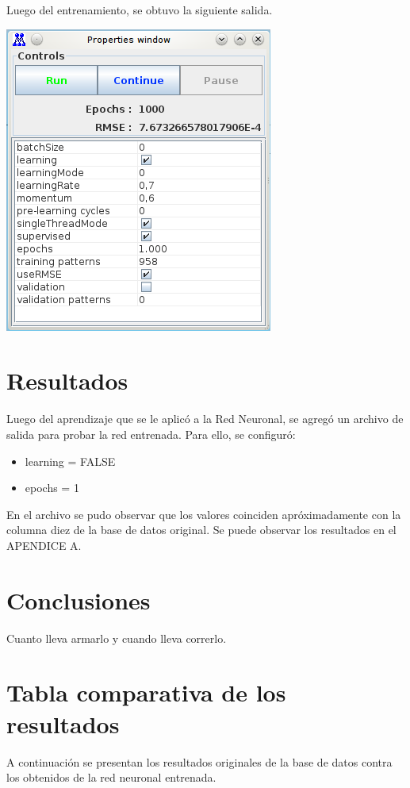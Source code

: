 \documentclass[12pt,titlepage]{article}
\begin{document}
Luego del entrenamiento, se obtuvo la siguiente salida.
\begin{center}
 \includegraphics{./Images/fin-corridas.png}
\end{center}

\section{Resultados}
Luego del aprendizaje que se le aplic\'o a la Red Neuronal, se agreg\'o un archivo de salida para probar la red entrenada. Para ello, se configur\'o: 
\begin{itemize}
 \item learning = FALSE
 \item epochs = 1
\end{itemize}
En el archivo se pudo observar que los valores coinciden apr\'oximadamente con la columna diez de la base de datos original. Se puede observar los resultados en el APENDICE A.

\section{Conclusiones}
Cuanto lleva armarlo y cuando lleva correrlo. \\


\appendix
\newpage
\section{Tabla comparativa de los resultados}
A continuaci\'on se presentan los resultados originales de la base de datos contra los obtenidos de la red neuronal entrenada.

\end{document}
